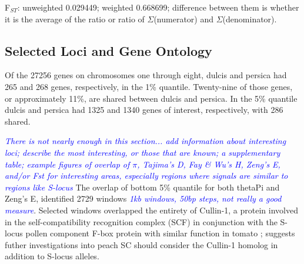 \documentclass[12pt]{article}
\newcommand{\jri}[1]{\textcolor{red}{\emph{#1}}}
\newcommand{\dv}[1]{\textcolor{blue}{\emph{#1}}}
\begin{document}
F$_{ST}$: unweighted 0.029449; weighted 0.668699; difference between them is whether it is the average of the ratio or ratio of $\Sigma$(numerator) and $\Sigma$(denominator).

%
\subsection*{Selected Loci and Gene Ontology}
Of the 27256 genes on chromosomes one through eight, dulcis and persica had 265 and 268 genes, respectively, in the 1\% quantile. 
%
Twenty-nine of those genes, or approximately 11\%, are shared between dulcis and persica.
%
In the 5\% quantile dulcis and persica had 1325 and 1340 genes of interest, respectively, with 286 shared.
%

\dv{There is not nearly enough in this section... add information about interesting loci; describe the most interesting, or those that are known; a supplementary table; example figures of overlap of $\pi$, Tajima's D, Fay \& Wu's H, Zeng's E, and/or Fst for interesting areas, especially regions where signals are similar to regions like S-locus}
% 
The overlap of bottom 5\% quantile for both thetaPi and Zeng's E, identified 2729 windows \dv{1kb windows, 50bp steps, not really a good measure}. Selected windows overlapped the entirety of Cullin-1, a protein involved in the self-compatibility recognition complex (SCF) in conjunction with the S-locus pollen component F-box protein with similar function in tomato \cite{li2014role}; suggests futher investigations into peach SC should consider the Cullin-1 homolog in addition to S-locus alleles.
%
\end{document}
